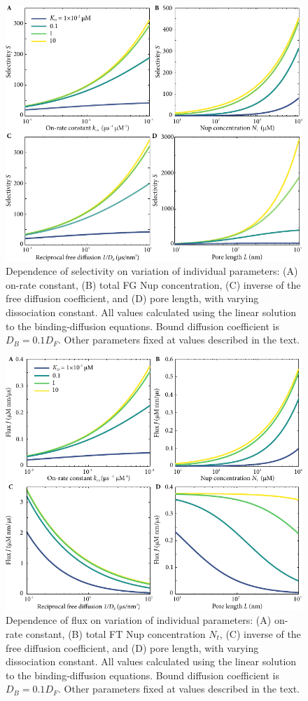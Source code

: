 \begin{figure}
\centering
\includegraphics[width=0.7\linewidth]{figs/ch02/parameter-variations.pdf}
\caption[Dependence of selectivity on model parameters.]{Dependence of selectivity on variation of individual
  parameters: (A) on-rate constant, (B) total FG Nup concentration, (C) inverse of the free diffusion coefficient, and (D) pore
  length, with varying dissociation constant. All values calculated using the linear solution to the binding-diffusion equations.  Bound diffusion coefficient is $D_B = 0.1D_F$. Other parameters fixed at values described in the text.}
\label{fig:parameter-variations}
\end{figure}

\begin{figure}
\centering
\includegraphics[width=0.7\linewidth]{figs/ch02/parameter-variations-abs-flux.pdf}
\caption[Dependence of absolute flux on model parameters.]{Dependence of flux on variation of individual parameters: (A) on-rate constant, (B) total FT Nup concentration $N_t$, (C) inverse
  of the free diffusion coefficient, and (D) pore length, with varying
  dissociation constant. All values calculated using the linear solution to the binding-diffusion equations. Bound diffusion coefficient is $D_B = 0.1D_F$. Other parameters fixed at values described in the text.}
\label{fig:parameter-variations-abs-flux}
\end{figure}

